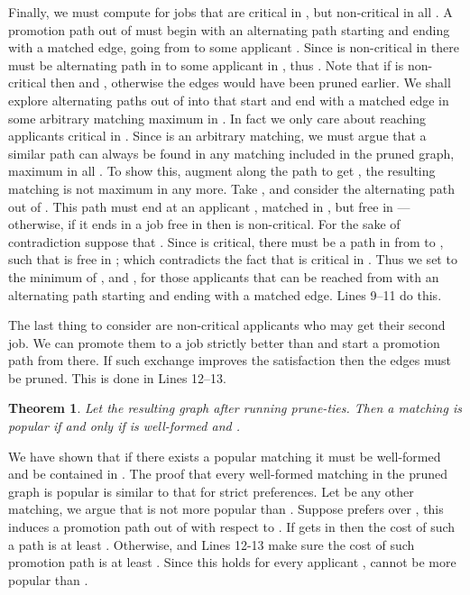 \documentclass[11pt]{article}
\newtheorem{theorem}{Theorem}
\begin{document}
{Finally, we must compute  for jobs  that are critical in , but non-critical in all . A promotion path out of  must begin with an alternating path starting and ending with a matched edge, going from  to some applicant . Since  is non-critical in  there must be alternating path in  to some applicant in , thus . Note that if  is non-critical then  and , otherwise the edges  would have been pruned earlier. We shall explore alternating paths out of  into  that start and end with a matched edge in some arbitrary matching  maximum in . In fact we only care about reaching applicants  critical in . Since  is an arbitrary matching, we must argue that a similar path can always be found in any matching  included in the pruned graph, maximum in all . To show this, augment along the path to get , the resulting matching is not maximum in  any more. Take , and consider the alternating path out of . This path must end at an applicant , matched in , but free in ---otherwise, if it ends in a job free in  then  is non-critical. For the sake of contradiction suppose that . Since  is critical, there must be a path in  from  to , such that  is free in ; which contradicts the fact that  is critical in . Thus we set  to the minimum of ,  and , for those applicants  that can be reached from  with an alternating path starting and ending with a matched edge. Lines 9--11 do this.

The last thing to consider are non-critical applicants  who may get their second job. We can promote them to a job  strictly better than  and start a promotion path from there. If such exchange improves the satisfaction then the edges  must be pruned. This is done in Lines 12--13.

\begin{theorem} Let  the resulting graph after running {\sc prune-ties}. Then a matching  is popular if and only if  is well-formed and .
\end{theorem}

We have shown that if there exists a popular matching it must be well-formed and be contained in . The proof that every well-formed matching  in the pruned graph is popular is similar to that for strict preferences. Let  be any other matching, we argue that  is not more popular than . Suppose  prefers  over , this induces a promotion path out of  with respect to . If  gets  in  then the cost of such a path is at least . Otherwise,  and Lines 12-13 make sure the cost of such promotion path is at least . Since this holds for every applicant ,  cannot be more popular than . 

}
\end{document}

